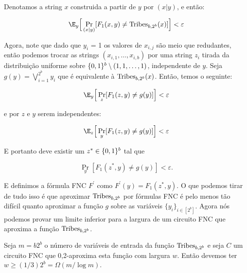 Denotamos a string $x$ construida a partir de $y$ por $(x \lvert y)$, e então:

\begin{equation*}
	\E_{y}\Big[\Pr_{(x \lvert y)}[F_{1}(x, y) \neq \Tribes_{b, 2^{b}}(x)]\Big] < \varepsilon
\end{equation*}

Agora, note que dado que $y_{i}$ = 1 os valores de $x_{i, j}$ são meio que redudantes, então podemos trocar as strings $(x_{i, 1}, \dots, x_{i, b})$ por uma string $z_{i}$ tirada da distribuição uniforme sobre $\{0, 1\}^{b} \setminus (1, 1, \dots, 1)$, independente de $y$. Seja $g(y) = \bigvee_{i = 1}^{2^{b}}y_{i}$ que é equivalente à $\text{Tribes}_{b, 2^{b}}(x)$. Então, temos o seguinte:

\begin{equation*}
	\E_{y}\Big[ \Pr_{z}[F_{1}(z, y) \neq g(y)]\Big] < \varepsilon
\end{equation*}

e por $z$ e $y$ serem independentes:

\begin{equation*}
	\E_{z}\Big[\Pr_{y}[F_{1}(z, y) \neq g(y)]\Big] < \varepsilon
\end{equation*}

E portanto deve existir um $z^{*} \in \{0, 1\}^{b}$ tal que

\begin{equation*}
	\Pr_{y}[F_{1}(z^{*}, y) \neq g(y)] < \varepsilon.
\end{equation*}

E definimos a fórmula FNC $F^{\prime}$ como $F^{\prime}(y) = F_{1}(z^{*}, y)$. O que podemos tirar de tudo isso é que aproximar $\text{Tribes}_{b, 2^{b}}$ por fórmulas FNC é pelo menos tão difícil quanto aproximar a função $g$ sobre as variáveis $\{y_{i}\}_{i \in [2^{b}]}$. Agora nós podemos provar um limite inferior para a largura de um circuito FNC que aproxima a função $\text{Tribes}_{b, 2^{b}}$.

\begin{teo} \label{tribes_width_lb}

Seja $m = b2^{b}$ o número de variáveis de entrada da função $\text{Tribes}_{b, 2^{b}}$ e seja $C$ um circuito FNC que 0,2-aproxima esta função com largura $w$. Então devemos ter $w \geq (1/3)2^{b} = \Omega(m/\log m)$.

\end{teo}

